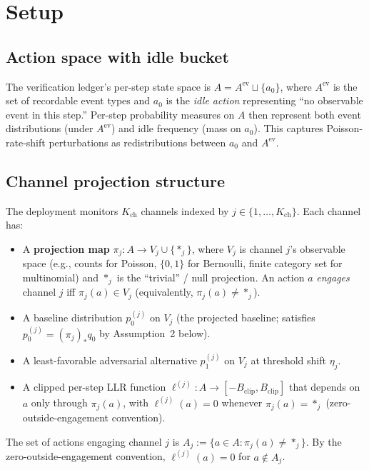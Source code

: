 \documentclass{article}
\newcommand{\Bclip}{B_{\mathrm{clip}}}
\newcommand{\Kch}{K_{\mathrm{ch}}}
\begin{document}
\section{Setup}

\subsection{Action space with idle bucket}

The verification ledger's per-step state space is $A = A^{\mathrm{ev}}
\sqcup \{a_0\}$, where $A^{\mathrm{ev}}$ is the set of recordable
event types and $a_0$ is the \emph{idle action} representing
``no observable event in this step.''  Per-step probability measures
on $A$ then represent both event distributions (under
$A^{\mathrm{ev}}$) and idle frequency (mass on $a_0$).  This
captures Poisson-rate-shift perturbations as redistributions
between $a_0$ and $A^{\mathrm{ev}}$.

\subsection{Channel projection structure}

The deployment monitors $\Kch$ channels indexed by $j \in
\{1, \ldots, \Kch\}$.  Each channel has:
\begin{itemize}
\item A \textbf{projection map} $\pi_j: A \to V_j \cup \{*_j\}$,
  where $V_j$ is channel $j$'s observable space (e.g., counts for
  Poisson, $\{0,1\}$ for Bernoulli, finite category set for
  multinomial) and $*_j$ is the ``trivial'' / null projection.  An
  action $a$ \emph{engages} channel $j$ iff $\pi_j(a) \in V_j$
  (equivalently, $\pi_j(a) \neq *_j$).
\item A baseline distribution $p_0^{(j)}$ on $V_j$ (the projected
  baseline; satisfies $p_0^{(j)} = (\pi_j)_* q_0$ by Assumption~2
  below).
\item A least-favorable adversarial alternative $p_1^{(j)}$ on
  $V_j$ at threshold shift $\eta_j$.
\item A clipped per-step LLR function
  $\ell^{(j)}: A \to [-\Bclip, \Bclip]$ that depends on $a$ only
  through $\pi_j(a)$, with $\ell^{(j)}(a) = 0$ whenever $\pi_j(a)
  = *_j$ (zero-outside-engagement convention).
\end{itemize}

The set of actions engaging channel $j$ is
$A_j := \{a \in A : \pi_j(a) \neq *_j\}$.  By the
zero-outside-engagement convention, $\ell^{(j)}(a) = 0$ for $a
\notin A_j$.
\end{document}
